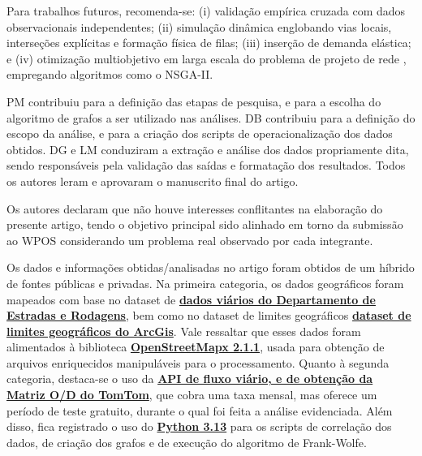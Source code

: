 \documentclass[portuguese]{sbc2025}%
\begin{document}
Para trabalhos futuros, recomenda-se: (i) validação empírica cruzada com dados observacionais independentes; (ii) simulação dinâmica englobando vias locais, interseções explícitas e formação física de filas; (iii) inserção de demanda elástica; e (iv) otimização multiobjetivo em larga escala do problema de projeto de rede \cite{leblanc1975dndp}, empregando algoritmos como o NSGA-II.

\begin{declarations}

\begin{contributions}
PM contribuiu para a definição das etapas de pesquisa, e para a escolha do algoritmo de grafos a ser utilizado nas análises. DB contribuiu para a definição do escopo da análise, e para a criação dos scripts de operacionalização dos dados obtidos. DG e LM conduziram a extração e análise dos dados propriamente dita, sendo responsáveis pela validação das saídas e formatação dos resultados. Todos os autores leram e aprovaram o manuscrito final do artigo.
\end{contributions}

\begin{interests}
Os autores declaram que não houve interesses conflitantes na elaboração do presente artigo, tendo o objetivo principal sido alinhado em torno da submissão ao WPOS considerando um problema real observado por cada integrante.
\end{interests}

\begin{materials}
Os dados e informações obtidas/analisadas no artigo foram obtidos de um híbrido de fontes públicas e privadas. Na primeira categoria, os dados geográficos foram mapeados com base no dataset de \textbf{\href{https://www.dados.df.gov.br/pt/inicio}{dados viários do Departamento de Estradas e Rodagens}}, bem como no dataset de limites geográficos \textbf{\href{https://geo-df-der.hub.arcgis.com/pages/downloads}{dataset de limites geográficos do ArcGis}}. Vale ressaltar que esses dados foram alimentados à biblioteca \textbf{\href{https://osmnx.readthedocs.io/en/stable/}{OpenStreetMapx 2.1.1}}, usada para obtenção de arquivos enriquecidos manipuláveis para o processamento. Quanto à segunda categoria, destaca-se o uso da \textbf{\href{https://www.tomtom.com/products/traffic-apis/}{API de fluxo viário, e de obtenção da Matriz O/D do TomTom}}, que cobra uma taxa mensal, mas oferece um período de teste gratuito, durante o qual foi feita a análise evidenciada. Além disso, fica registrado o uso do \textbf{\href{https://www.python.org}{Python 3.13}} para os scripts de correlação dos dados, de criação dos grafos e de execução do algoritmo de Frank-Wolfe.
\end{materials}


\end{declarations}
\end{document}
